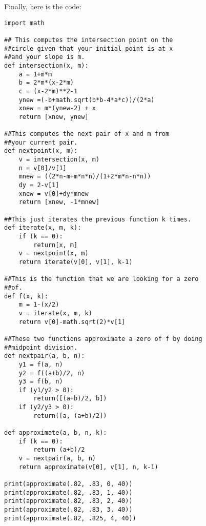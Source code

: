 \documentclass[11pt]{article}
\theoremstyle{definition}
\begin{document}
Finally, here is the code:
\begin{verbatim}
import math

## This computes the intersection point on the
##circle given that your initial point is at x
##and your slope is m.
def intersection(x, m):
    a = 1+m*m
    b = 2*m*(x-2*m)
    c = (x-2*m)**2-1
    ynew =(-b+math.sqrt(b*b-4*a*c))/(2*a)
    xnew = m*(ynew-2) + x
    return [xnew, ynew]

##This computes the next pair of x and m from
##your current pair.
def nextpoint(x, m):
    v = intersection(x, m)
    n = v[0]/v[1]
    mnew = ((2*n-m+m*n*n)/(1+2*m*n-n*n))
    dy = 2-v[1]
    xnew = v[0]+dy*mnew
    return [xnew, -1*mnew]

##This just iterates the previous function k times.
def iterate(x, m, k):
    if (k == 0):
        return[x, m]
    v = nextpoint(x, m)
    return iterate(v[0], v[1], k-1)

##This is the function that we are looking for a zero
##of.
def f(x, k):
    m = 1-(x/2)
    v = iterate(x, m, k)
    return v[0]-math.sqrt(2)*v[1]

##These two functions approximate a zero of f by doing
##midpoint division.
def nextpair(a, b, n):
    y1 = f(a, n)
    y2 = f((a+b)/2, n)
    y3 = f(b, n)
    if (y1/y2 > 0):
        return([(a+b)/2, b])
    if (y2/y3 > 0):
        return([a, (a+b)/2])

def approximate(a, b, n, k):
    if (k == 0):
        return (a+b)/2
    v = nextpair(a, b, n)
    return approximate(v[0], v[1], n, k-1)

print(approximate(.82, .83, 0, 40))
print(approximate(.82, .83, 1, 40))
print(approximate(.82, .83, 2, 40))
print(approximate(.82, .83, 3, 40))
print(approximate(.82, .825, 4, 40))

\end{verbatim}
%
\end{document}
